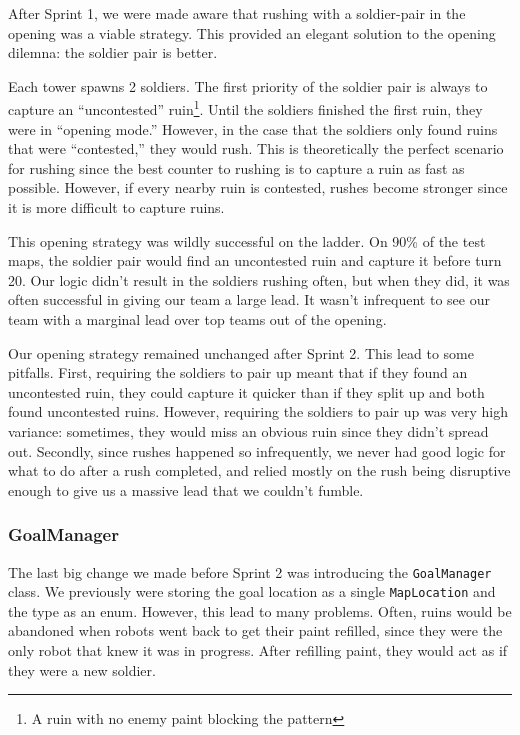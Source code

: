 \medskip

After Sprint 1, we were made aware that rushing with a soldier-pair in the opening was a viable strategy. This provided an elegant solution to the opening dilemna: the soldier pair is better.

\medskip

Each tower spawns 2 soldiers. The first priority of the soldier pair is always to capture an ``uncontested'' ruin\footnote{A ruin with no enemy paint blocking the pattern}. Until the soldiers finished the first ruin, they were in ``opening mode.'' However, in the case that the soldiers only found ruins that were ``contested,'' they would rush. This is theoretically the perfect scenario for rushing since the best counter to rushing is to capture a ruin as fast as possible. However, if every nearby ruin is contested, rushes become stronger since it is more difficult to capture ruins.\\

\medskip

This opening strategy was wildly successful on the ladder. On 90\% of the test maps, the soldier pair would find an uncontested ruin and capture it before turn 20. Our logic didn't result in the soldiers rushing often, but when they did, it was often successful in giving our team a large lead. It wasn't infrequent to see our team with a marginal lead over top teams out of the opening.

\medskip

Our opening strategy remained unchanged after Sprint 2. This lead to some pitfalls. First, requiring the soldiers to pair up meant that if they found an uncontested ruin, they could capture it quicker than if they split up and both found uncontested ruins. However, requiring the soldiers to pair up was very high variance: sometimes, they would miss an obvious ruin since they didn't spread out. Secondly, since rushes happened so infrequently, we never had good logic for what to do after a rush completed, and relied mostly on the rush being disruptive enough to give us a massive lead that we couldn't fumble.


\subsubsection{GoalManager}

The last big change we made before Sprint 2 was introducing the \verb|GoalManager| class. We previously were storing the goal location as a single \verb|MapLocation| and the type as an enum. However, this lead to many problems. Often, ruins would be abandoned when robots went back to get their paint refilled, since they were the only robot that knew it was in progress. After refilling paint, they would act as if they were a new soldier.

